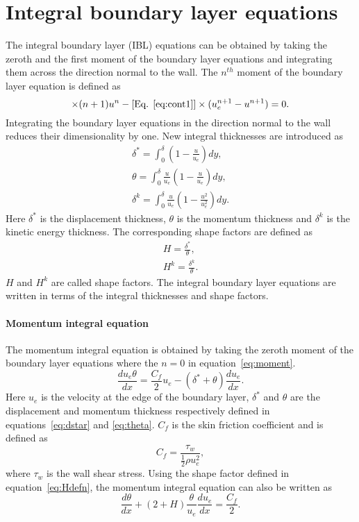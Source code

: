 \section{Integral boundary layer equations}\label{sec:iblvgeqns}
The integral boundary layer (IBL) equations can be obtained by taking the zeroth and the first moment of the boundary layer equations and integrating them across the direction normal to the wall. The $n^{th}$ moment of the boundary layer equation is defined as~\cite{Matsushita}
\begin{equation}
[\text{Eq. }\ref{eq:mom1}]\times(n+1)u^n - [\text{Eq. }\ref{eq:cont1}]\times(u_e^{n+1} - u^{n+1}) = 0.
\label{eq:moment}
\end{equation}
Integrating the boundary layer equations in the direction normal to the wall reduces their dimensionality by one. New integral thicknesses are introduced as
\begin{align}
\delta^{\ast} = \int_0^{\delta} \left(1-\frac{u}{u_e}\right) dy,\label{eq:dstar} \\
\theta = \int_0^{\delta}\frac{u}{u_e} \left(1-\frac{u}{u_e}\right) dy, \label{eq:theta}\\
\delta^{k} = \int_0^{\delta}\frac{u}{u_e} \left(1-\frac{u^2}{u_e^2}\right) dy.\label{eq:dkin}
\end{align}
Here $\delta^{\ast}$ is the displacement thickness, $\theta$ is the momentum thickness and $\delta^{k}$ is the kinetic energy thickness. The corresponding shape factors are defined as
\begin{align}
H = \frac{\delta^{\ast}}{\theta}, \label{eq:Hdefn} \\
H^k = \frac{\delta^k}{\theta}.\label{eq:Hkdefn}
\end{align}
$H$ and $H^k$ are called shape factors. The integral boundary layer equations are written in terms of the integral thicknesses and shape factors.

\paragraph{Momentum integral equation}

The momentum integral equation is obtained by taking the zeroth moment of the boundary layer equations where the $n = 0$ in equation~\ref{eq:moment}. 
\begin{equation}
\frac{d u_e \theta}{dx} = \frac{C_f}{2}u_e - (\delta^{\ast} + \theta)\frac{d u_e}{dx}.
\end{equation}
Here $u_e$ is the velocity at the edge of the boundary layer, $\delta^{\ast}$ and $\theta$ are the displacement and momentum thickness respectively defined in equations~\ref{eq:dstar} and \ref{eq:theta}. $C_f$ is the skin friction coefficient and is defined as
\begin{equation}
C_f = \frac{\tau_w}{\frac{1}{2}\rho u_e^2},
\end{equation}
where $\tau_w$ is the wall shear stress. Using the shape factor defined in equation~\ref{eq:Hdefn}, the momentum integral equation can also be written as
\begin{equation}
\frac{d\theta}{dx}+(2+H)\frac{\theta}{u_e}\frac{du_e}{dx} =\frac{C_f}{2}.
\label{eq:ibleq1}
\end{equation}
